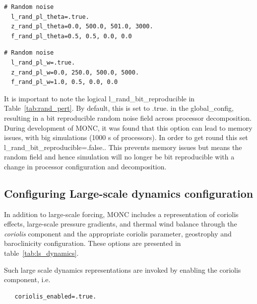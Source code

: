 \documentclass[a4paper,11pt]{article}
\begin{document}
\begin{lstlisting}[caption={Example configuration snippet for setting random perturbations
  of potential temperature. This will apply random noise of $\pm$ 0.5 K between
  0 and 500 m, with no noise applied aboves. Taken from testcases/shallow\_convection/bomex.mcf}]
  # Random noise
  l_rand_pl_theta=.true.
  z_rand_pl_theta=0.0, 500.0, 501.0, 3000.
  f_rand_pl_theta=0.5, 0.5, 0.0, 0.0
\end{lstlisting}

\begin{lstlisting}[caption={Example configuration snippet for applying random perturbations
  to the vertical velocity. This will apply $\pm$ 1 m s$^{-1}$
  at the surface, with the noise decreasing to $\pm$ 0.5 m s$^{-1}$ at 250 m and $\pm$
  0.25 m s$^{-1}$ by 500 m and no noise above. Taken from testcases/drybl/drybl.mcf}]
  # Random noise
  l_rand_pl_w=.true.
  z_rand_pl_w=0.0, 250.0, 500.0, 5000.
  f_rand_pl_w=1.0, 0.5, 0.0, 0.0
\end{lstlisting}

It is important to note the logical l\_rand\_bit\_reproducible in Table~\ref{tab:rand_pert}. By default, this
is set to .true. in the global\_config, resulting in a bit reproducible random noise field
across processor decomposition. During development of MONC, it was found that this option can
lead to memory issues, with big simulations (1000 s of processors). In order to get round this
set l\_rand\_bit\_reproducible=.false.. This prevents memory issues but means the
random field and hence simulation will no longer be bit reproducible with a change in
processor configuration and decomposition.

\subsection{Configuring Large-scale dynamics configuration}

In addition to large-scale forcing, MONC includes a representation of coriolis effects,
large-scale pressure gradients, and thermal wind balance through the \emph{coriolis}
component and the appropriate coriolis parameter, geostrophy and baroclinicity configuration.
These options are presented in table~\ref{tab:ls_dynamics}.

Such large scale dynamics representations are invoked by enabling the coriolis component, i.e.
 \begin{lstlisting}
   coriolis_enabled=.true.
 \end{lstlisting}
\end{document}
